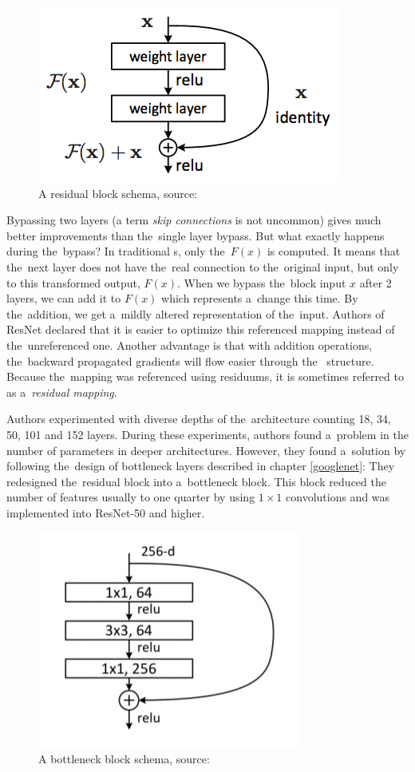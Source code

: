 \begin{figure}[H]
   \centering
	\includegraphics[width=0.4\linewidth]{./pictures/residual-block.png}
	\caption[Residual block]{A residual block schema, source: \cite{resnet}}
      \label{fig:res-block}
\end{figure}

Bypassing two layers (a term \textit{skip connections} is not uncommon) gives 
much better improvements than the~single layer bypass. But what exactly happens 
during the~bypass? In traditional s, only the~$F(x)$ is computed. It 
means that the~next layer does not have the~real connection to the~original 
input, but only to this transformed output, $F(x)$. When we bypass the~block 
input $x$ after 2 layers, we can add it to $F(x)$ which represents a~change this 
time. By the~addition, we get a~mildly altered representation of the~input. 
Authors of ResNet declared that it is easier to optimize this referenced mapping 
instead of the~unreferenced one. Another advantage is that with addition 
operations, the~backward propagated gradients will flow easier through the~
structure. Because the~mapping was referenced using residuums, it is sometimes 
referred to as a~\textit{residual mapping}.

Authors experimented with diverse depths of the~architecture counting 18, 34, 
50, 101 and 152 layers. During these experiments, authors found a~problem in the
number of parameters in deeper architectures. However, they found a~solution by 
following the~design of bottleneck layers described in chapter \ref{googlenet}: 
They redesigned the~residual block into a~bottleneck block. This block reduced 
the number of features usually to one quarter by using $1 \times 1$ convolutions 
and was implemented into ResNet-50 and higher.

\begin{figure}[H]
   \centering
	\includegraphics[width=0.4\linewidth]{./pictures/bottleneck-block.jpg}
	\caption[Bottleneck block]{A bottleneck block schema, source: \cite{resnet}}
      \label{fig:bottleneck-block}
\end{figure}


